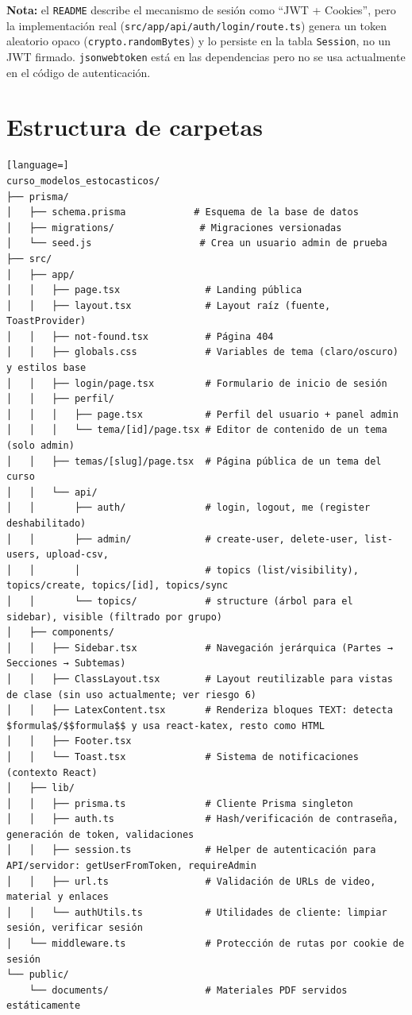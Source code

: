 \documentclass[11pt,a4paper]{article}
\newcommand{\code}[1]{\texttt{#1}}
\begin{document}
\begin{nota}
\textbf{Nota:} el \code{README} describe el mecanismo de sesión como ``JWT + Cookies'', pero la implementación real (\code{src/app/api/auth/login/route.ts}) genera un token aleatorio opaco (\code{crypto.randomBytes}) y lo persiste en la tabla \code{Session}, no un JWT firmado. \code{jsonwebtoken} está en las dependencias pero no se usa actualmente en el código de autenticación.
\end{nota}

\section{Estructura de carpetas}

\begin{lstlisting}[language=]
curso_modelos_estocasticos/
├── prisma/
│   ├── schema.prisma            # Esquema de la base de datos
│   ├── migrations/               # Migraciones versionadas
│   └── seed.js                   # Crea un usuario admin de prueba
├── src/
│   ├── app/
│   │   ├── page.tsx               # Landing pública
│   │   ├── layout.tsx             # Layout raíz (fuente, ToastProvider)
│   │   ├── not-found.tsx          # Página 404
│   │   ├── globals.css            # Variables de tema (claro/oscuro) y estilos base
│   │   ├── login/page.tsx         # Formulario de inicio de sesión
│   │   ├── perfil/
│   │   │   ├── page.tsx           # Perfil del usuario + panel admin
│   │   │   └── tema/[id]/page.tsx # Editor de contenido de un tema (solo admin)
│   │   ├── temas/[slug]/page.tsx  # Página pública de un tema del curso
│   │   └── api/
│   │       ├── auth/              # login, logout, me (register deshabilitado)
│   │       ├── admin/             # create-user, delete-user, list-users, upload-csv,
│   │       │                      # topics (list/visibility), topics/create, topics/[id], topics/sync
│   │       └── topics/            # structure (árbol para el sidebar), visible (filtrado por grupo)
│   ├── components/
│   │   ├── Sidebar.tsx            # Navegación jerárquica (Partes → Secciones → Subtemas)
│   │   ├── ClassLayout.tsx        # Layout reutilizable para vistas de clase (sin uso actualmente; ver riesgo 6)
│   │   ├── LatexContent.tsx       # Renderiza bloques TEXT: detecta $formula$/$$formula$$ y usa react-katex, resto como HTML
│   │   ├── Footer.tsx
│   │   └── Toast.tsx              # Sistema de notificaciones (contexto React)
│   ├── lib/
│   │   ├── prisma.ts              # Cliente Prisma singleton
│   │   ├── auth.ts                # Hash/verificación de contraseña, generación de token, validaciones
│   │   ├── session.ts             # Helper de autenticación para API/servidor: getUserFromToken, requireAdmin
│   │   ├── url.ts                 # Validación de URLs de video, material y enlaces
│   │   └── authUtils.ts           # Utilidades de cliente: limpiar sesión, verificar sesión
│   └── middleware.ts              # Protección de rutas por cookie de sesión
└── public/
    └── documents/                 # Materiales PDF servidos estáticamente
\end{lstlisting}
\end{document}
